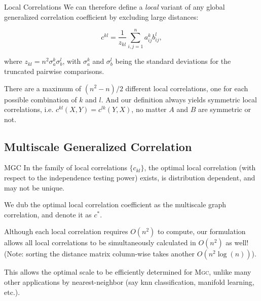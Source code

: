 \documentclass{beamer}
\newcommand{\G}{c}
\providecommand{\sct}[1]{{\normalfont\textsc{#1}}}
\newcommand{\Mgc}{\sct{Mgc}}
\begin{document}
\begin{frame}{Local Correlations}
We can therefore define a \emph{local} variant of any global generalized correlation coefficient by  excluding large distances: 

\pause
\medskip
\begin{equation}
\label{localCoef}
\G^{kl}=\dfrac{1}{z_{kl}} {\textstyle \sum_{i,j=1}^n a_{ij}^k b_{ij}^l},
\end{equation}

\pause
\medskip
where $z_{kl}=n^2 \sigma_a^k \sigma_b^l$,  with $\sigma_a^k$ and $\sigma_b^{l}$ being the standard deviations for the truncated pairwise comparisons. 

\pause
\medskip
There are a maximum of $(n^2-n)/2$ different local correlations, one for each possible combination of $k$ and $l$. And our definition always yields symmetric local correlations, i.e. $\G^{kl}(X,Y)=\G^{lk}(Y,X)$, no matter $A$ and $B$ are symmetric or not.
\end{frame}

\subsection{Multiscale Generalized Correlation}
\begin{frame}{MGC}
In the family of local correlations $\{\G_{kl}\}$, the optimal local correlation (with respect to the independence testing power) exists, is distribution dependent, and may not be unique.

\pause
\medskip
We dub the optimal local correlation coefficient as the multiscale graph correlation, and denote it as $\G^{*}$.

\pause
\medskip
Although each local correlation requires $O(n^2)$ to compute, our formulation allows all local correlations to be simultaneously calculated in $O(n^2)$ as well! (Note: sorting the distance matrix column-wise takes another $O(n^2 \log(n))$).

\pause
\medskip
This allows the optimal scale to be efficiently determined for \Mgc, unlike many other applications by nearest-neighbor (say knn classification, manifold learning, etc.).

\end{frame}
\end{document}
